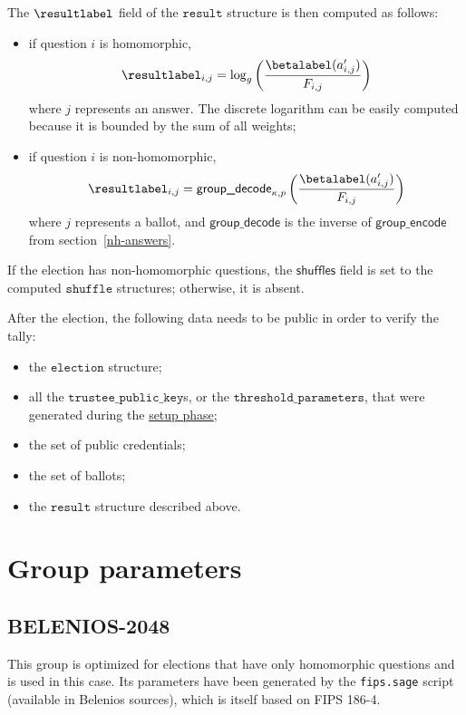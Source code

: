 \documentclass[a4paper]{article}
\newcommand{\tpk}{\texttt{trustee\_public\_key}}
\newcommand{\election}{\texttt{election}}
\newcommand{\result}{\texttt{result}}
\begin{document}
The $\resultlabel$ field of the $\result$ structure is then computed
as follows:
\begin{itemize}
\item if question $i$ is homomorphic,
  \[
    \resultlabel_{i,j}=\log_g\left(\frac{\betalabel(a'_{i,j})}{F_{i,j}}\right)
  \]
  where $j$ represents an answer. The discrete logarithm can be easily
  computed because it is bounded by the sum of all weights;
\item if question $i$ is non-homomorphic,
  \[
    \resultlabel_{i,j}=\textsf{group\_decode}_{\kappa,p}\left(\frac{\betalabel(a'_{i,j})}{F_{i,j}}\right)
  \]
  where $j$ represents a ballot, and $\textsf{group\_decode}$ is the
  inverse of $\textsf{group\_encode}$ from section~\ref{nh-answers}.
\end{itemize}
If the election has non-homomorphic questions, the $\textsf{shuffles}$
field is set to the computed $\texttt{shuffle}$ structures; otherwise,
it is absent.

After the election, the following data needs to be public in order to
verify the tally:
\begin{itemize}
\item the $\election$ structure;
\item all the $\tpk$s, or the $\texttt{threshold\_parameters}$, that
  were generated during the \hyperref[election-setup]{setup phase};
\item the set of public credentials;
\item the set of ballots;
\item the $\result$ structure described above.
\end{itemize}

\section{Group parameters}
\label{default-group}

\subsection{BELENIOS-2048}
\label{h-group}

This group is optimized for elections that have only homomorphic
questions and is used in this case. Its parameters have been generated
by the \verb=fips.sage= script (available in Belenios sources), which
is itself based on FIPS 186-4.
\end{document}
